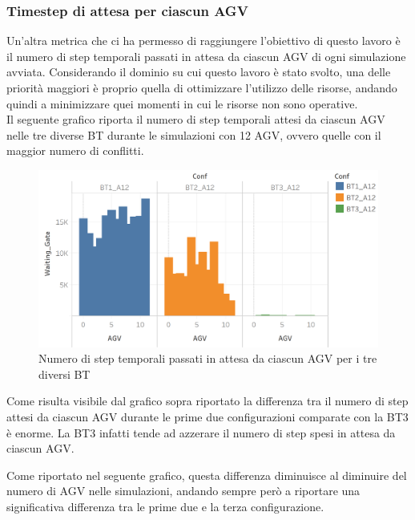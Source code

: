\documentclass[12pt]{article}
\begin{document}
\newpage

\subsubsection{Timestep di attesa per ciascun AGV}
Un'altra metrica che ci ha permesso di raggiungere l'obiettivo di questo lavoro è il numero di step temporali passati in attesa da ciascun AGV di ogni simulazione avviata. Considerando il dominio su cui questo lavoro è stato svolto, una delle priorità maggiori è proprio quella di ottimizzare l'utilizzo delle risorse, andando quindi a minimizzare quei momenti in cui le risorse non sono operative. \\

\noindent Il seguente grafico riporta il numero di step temporali attesi da ciascun AGV nelle tre diverse BT durante le simulazioni con 12 AGV, ovvero quelle con il maggior numero di conflitti.
\begin{figure}[H]
\centering
  \includegraphics[width=1\linewidth]{Figures/Results_Graphics/Waiting.png}
  \caption{Numero di step temporali passati in attesa da ciascun AGV per i tre diversi BT}\label{fig:waiting_bt_a12}
\end{figure}

\noindent Come risulta visibile dal grafico sopra riportato la differenza tra il numero di step attesi da ciascun AGV durante le prime due configurazioni comparate con la BT3 è enorme. La BT3 infatti tende ad azzerare il numero di step spesi in attesa da ciascun AGV.

\newpage 

\noindent Come riportato nel seguente grafico, questa differenza diminuisce al diminuire del numero di AGV nelle simulazioni, andando sempre però a riportare una significativa differenza tra le prime due e la terza configurazione.
\end{document}
